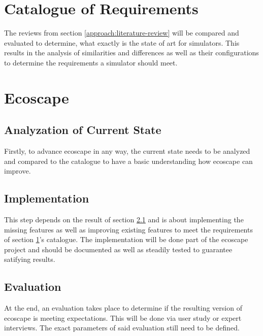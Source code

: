 \section{Catalogue of Requirements}\label{approach:catalogue}
The reviews from section \ref{approach:literature-review} will be compared and evaluated to determine, what exactly is the state of art for simulators.
This results in the analysis of similarities and differences as well as their configurations to determine the requirements a simulator should meet.

\section{Ecoscape}\label{approach:ecoscape}
\subsection{Analyzation of Current State}\label{approach:ecoscape-current}
Firstly, to advance ecoscape in any way, the current state needs to be analyzed and compared to the catalogue to have a basic understanding how ecoscape can improve.

\subsection{Implementation}\label{approach:ecoscape-impl}
This step depends on the result of section \ref{approach:ecoscape-current} and is about implementing the missing features as well as improving existing features to meet the requirements of section \ref{approach:catalogue}'s catalogue.
The implementation will be done part of the ecoscape project and should be documented as well as steadily tested to guarantee satifying results.

\subsection{Evaluation}\label{approach:ecoscape-eval}
At the end, an evaluation takes place to determine if the resulting version of ecoscape is meeting expectations. This will be done via user study or expert interviews.
The exact parameters of said evaluation still need to be defined.

